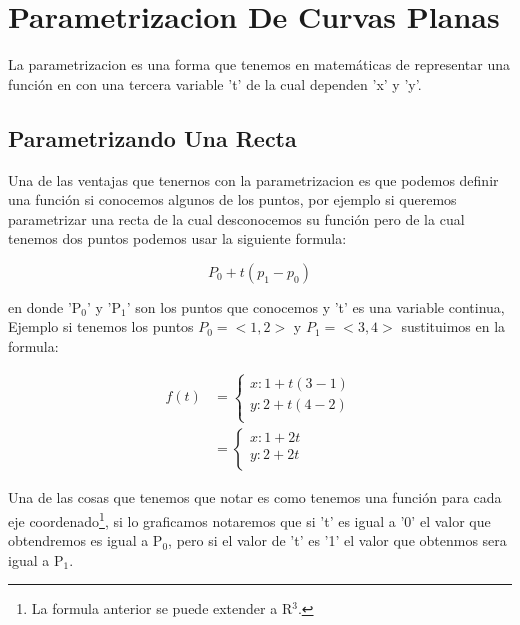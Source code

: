 \documentclass{article}
\begin{document}
\section{Parametrizacion De Curvas Planas}
\label{sec:orgbc047f5}
La parametrizacion es una forma que tenemos en matemáticas de representar una función en con una tercera variable 't' de la cual dependen 'x' y 'y'.

\subsection{Parametrizando Una Recta}
\label{sec:orgd0e9849}
Una de las ventajas que tenernos con la parametrizacion es que podemos definir una función si conocemos algunos de los puntos, por ejemplo si queremos parametrizar una recta de la cual desconocemos su función pero de la cual tenemos dos puntos podemos usar la siguiente formula:

\[
P_0 + t(p_1 - p_0)
\]

en donde 'P\(_{\text{0}}\)' y 'P\(_{\text{1}}\)' son los puntos que conocemos y 't' es una variable continua, Ejemplo si tenemos los puntos \(P_0 = <1,2>\) y \(P_1 = <3,4>\) sustituimos en la formula:

\[ \begin{aligned} f(t) &= \begin{cases}
  x: 1 + t (3-1) \\
  y: 2 + t (4-2) \\
\end{cases} \\ &= \begin{cases}
  x: 1 + 2t \\
  y: 2 + 2t \\ 
\end{cases} \end{aligned} \]

Una de las cosas que tenemos que notar es como tenemos una función para cada eje coordenado\footnote{La formula anterior se puede extender a R\(^{\text{3}}\).}, si lo graficamos notaremos que si 't' es igual a '0' el valor que obtendremos es igual a P\(_{\text{0}}\), pero si el valor de 't' es '1' el valor que obtenmos sera igual a P\(_{\text{1}}\).
\end{document}
